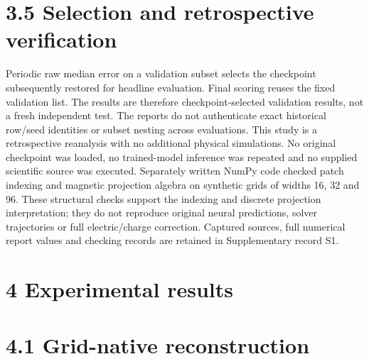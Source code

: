 \documentclass[11pt]{article}
\begin{document}
\section*{3.5 Selection and retrospective verification}

Periodic raw median error on a validation subset selects the checkpoint subsequently restored
for headline evaluation. Final scoring reuses the fixed validation list. The results are therefore
checkpoint-selected validation results, not a fresh independent test. The reports do not authenticate
exact historical row/seed identities or subset nesting across evaluations.
This study is a retrospective reanalysis with no additional physical simulations. No original
checkpoint was loaded, no trained-model inference was repeated and no supplied scientific source
was executed. Separately written NumPy code checked patch indexing and magnetic projection
algebra on synthetic grids of widths 16, 32 and 96. These structural checks support the indexing
and discrete projection interpretation; they do not reproduce original neural predictions, solver
trajectories or full electric/charge correction. Captured sources, full numerical report values and
checking records are retained in Supplementary record S1.

\section*{4 Experimental results}


\section*{4.1 Grid-native reconstruction}
\end{document}
